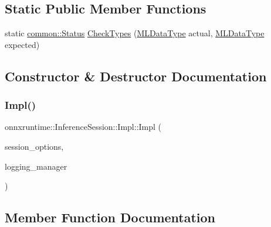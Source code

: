 \subsection*{Static Public Member Functions}
\begin{DoxyCompactItemize}
\item 
static \mbox{\hyperlink{classonnxruntime_1_1common_1_1Status}{common\+::\+Status}} \mbox{\hyperlink{classonnxruntime_1_1InferenceSession_1_1Impl_a1ac8cdb4798aecb427ccfaf41511d8f6}{Check\+Types}} (\mbox{\hyperlink{namespaceonnxruntime_ad77d0a6e838ec7da5dc35fed5ee66b49}{M\+L\+Data\+Type}} actual, \mbox{\hyperlink{namespaceonnxruntime_ad77d0a6e838ec7da5dc35fed5ee66b49}{M\+L\+Data\+Type}} expected)
\end{DoxyCompactItemize}


\subsection{Constructor \& Destructor Documentation}
\mbox{\label{classonnxruntime_1_1InferenceSession_1_1Impl_a27d5ce43614c5f4d516d32aa1819fbe8}} 
\subsubsection{\texorpdfstring{Impl()}{Impl()}}
{\footnotesize\ttfamily onnxruntime\+::\+Inference\+Session\+::\+Impl\+::\+Impl (\begin{DoxyParamCaption}\item[{const \mbox{\hyperlink{structonnxruntime_1_1SessionOptions}{Session\+Options}} \&}]{session\+\_\+options,  }\item[{\mbox{\hyperlink{classonnxruntime_1_1logging_1_1LoggingManager}{logging\+::\+Logging\+Manager}} $\ast$}]{logging\+\_\+manager }\end{DoxyParamCaption})\hspace{0.3cm}{\ttfamily [inline]}}



\subsection{Member Function Documentation}
\mbox{\label{classonnxruntime_1_1InferenceSession_1_1Impl_ac9f294a90e67e3838589669752a772dd}} 
